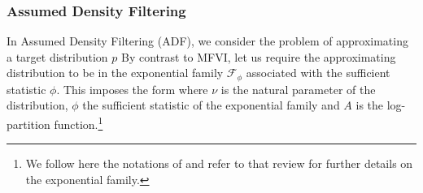 \subsubsection{Assumed Density Filtering}

\vspace*{2cm}
In Assumed Density Filtering (ADF), we consider the problem of approximating a target distribution $p$
By contrast to MFVI, let us require the approximating distribution to be in the exponential family $\mathcal F_\phi$ associated with the sufficient statistic $\phi$. This imposes the form
where $\nu$ is the natural parameter of the distribution, $\phi$ the sufficient statistic of the exponential family and $A$ is the log-partition function.\footnote{We follow here the notations of \citet{wainwright08} and refer to that review for further details on the exponential family.} \\
%
%
